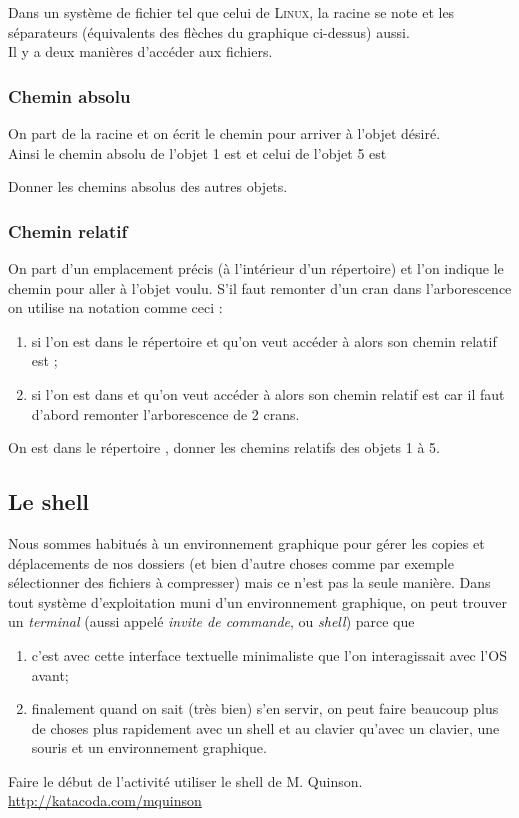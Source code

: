 \documentclass[a5paper,12pt,french,landscape]{book}
\begin{document}
	Dans un système de fichier tel que celui de \textsc{Linux}, la racine se note \tw{/} et les séparateurs (équivalents des flèches du graphique ci-dessus) aussi.\\
	Il y a deux manières d'accéder aux fichiers.
	\subsubsection*{Chemin absolu}
	On part de la racine et on écrit le chemin pour arriver à l'objet désiré.\\
	Ainsi le chemin absolu de l'objet 1 est  et celui de l'objet 5 est 
	
	\begin{exercice}[]
		Donner les chemins absolus des autres objets.
	\end{exercice}

	\subsubsection*{Chemin relatif}
	On part d'un emplacement précis (à l'intérieur d'un répertoire) et l'on indique le chemin pour aller à l'objet voulu. S'il faut remonter d'un cran dans l'arborescence on utilise na notation  comme ceci :
	\begin{enumerate}[--]
		\item 	si l'on est dans le répertoire  et qu'on veut accéder à  alors son chemin relatif est ;
		\item 	si l'on est dans  et qu'on veut accéder à  alors son chemin relatif est  car il faut d'abord remonter l'arborescence de 2 crans.
	\end{enumerate}

	\begin{exercice}[]
		On est dans le répertoire , donner les chemins relatifs des objets 1 à 5.
	\end{exercice}
	
	\subsection*{Le shell}
	
	Nous sommes habitués à un environnement graphique pour gérer les copies et déplacements de nos dossiers (et bien d'autre choses comme par exemple sélectionner des fichiers à compresser) mais ce n'est pas la seule manière. Dans tout système d'exploitation muni d'un environnement graphique, on peut trouver un \textit{terminal} (aussi appelé \textit{invite de commande}, ou \textit{shell}) parce que
	\begin{enumerate}[--]
		\item 	c'est avec cette interface textuelle minimaliste que l'on interagissait avec l'\textsc{OS} avant;
		\item 	finalement quand on sait (très bien) s'en servir, on peut faire beaucoup plus de choses plus rapidement avec un shell et au clavier qu'avec un clavier, une souris et un environnement graphique.
	\end{enumerate}

	\begin{exercice}[]
		Faire le début de l'activité \og utiliser le shell\fg{} de M. Quinson.\\
		\url{http://katacoda.com/mquinson}
	\end{exercice}
\end{document}
